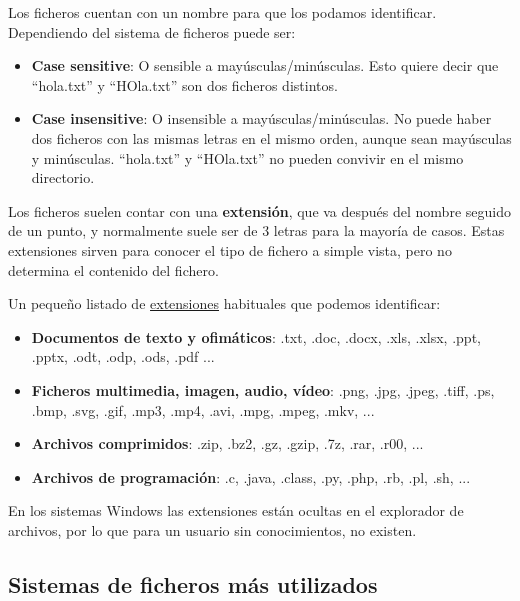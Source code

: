 Los ficheros cuentan con un nombre para que los podamos identificar. Dependiendo del sistema de ficheros puede ser:
\begin{itemize}
    \item \textbf{Case sensitive}: O sensible a mayúsculas/minúsculas. Esto quiere decir que “hola.txt” y “HOla.txt” son dos ficheros distintos.
    \item \textbf{Case insensitive}: O insensible a mayúsculas/minúsculas. No puede haber dos ficheros con las mismas letras en el mismo orden, aunque sean mayúsculas y minúsculas. “hola.txt” y “HOla.txt” no pueden convivir en el mismo directorio.
\end{itemize}

Los ficheros suelen contar con una \textbf{extensión}, que va después del nombre seguido de un punto, y normalmente suele ser de 3 letras para la mayoría de casos. Estas extensiones sirven para conocer el tipo de fichero a simple vista, pero no determina el contenido del fichero.


Un pequeño listado de  \href{https://en.wikipedia.org/wiki/List_of_filename_extensions}{extensiones}  habituales que podemos identificar:

\begin{itemize}
    \item \textbf{Documentos de texto y ofimáticos}: .txt, .doc, .docx, .xls, .xlsx, .ppt, .pptx, .odt, .odp, .ods, .pdf ...
    \item \textbf{Ficheros multimedia, imagen, audio, vídeo}: .png, .jpg, .jpeg, .tiff, .ps, .bmp, .svg, .gif, .mp3, .mp4, .avi, .mpg, .mpeg, .mkv, ...
    \item \textbf{Archivos comprimidos}: .zip, .bz2, .gz, .gzip, .7z, .rar, .r00, ...
    \item \textbf{Archivos de programación}: .c, .java, .class, .py, .php, .rb, .pl, .sh, ...
\end{itemize}

En los sistemas Windows las extensiones están ocultas en el explorador de archivos, por lo que para un usuario sin conocimientos, no existen.



\subsection{Sistemas de ficheros más utilizados}

